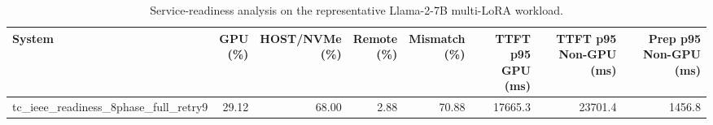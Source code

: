 \begin{table}[t]
\centering
\caption{Service-readiness analysis on the representative Llama-2-7B multi-LoRA workload.}
\label{tab:service_readiness}
\setlength{\tabcolsep}{2.4pt}
\renewcommand{\arraystretch}{1.10}
\begin{tabular}{lrrrrrrr}
\hline
System & \shortstack{GPU\\(\%)} & \shortstack{HOST/NVMe\\(\%)} & \shortstack{Remote\\(\%)} & \shortstack{Mismatch\\(\%)} & \shortstack{TTFT p95\\GPU (ms)} & \shortstack{TTFT p95\\Non-GPU (ms)} & \shortstack{Prep p95\\Non-GPU (ms)} \\
\hline
tc_ieee_readiness_8phase_full_retry9 & 29.12 & 68.00 & 2.88 & 70.88 & 17665.3 & 23701.4 & 1456.8 \\
\hline
\end{tabular}
\end{table}
